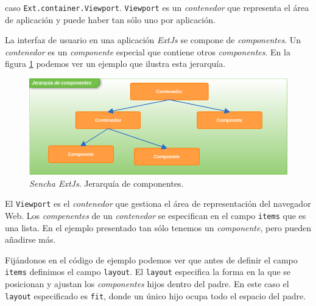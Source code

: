 	caso \texttt{Ext.container.Viewport}. \texttt{Viewport} es un \emph{contenedor} que representa el área de aplicación y puede haber tan sólo
	uno por aplicación. 
 	\par
	La interfaz de usuario en una aplicación \emph{ExtJs} se compone de \emph{componentes}. Un \emph{contenedor} es un \emph{componente} especial que
	contiene otros \emph{componentes}. En la figura \ref{fig:comps} podemos ver un ejemplo que ilustra esta jerarquía.
	\begin{figure}[h]
		\centering
		\includegraphics[keepaspectratio, width=1\textwidth]{./img/comps.png}
		\caption{\emph{Sencha ExtJs}. Jerarquía de componentes.}   
		\label{fig:comps}
	\end{figure}
 	\par
	El \texttt{Viewport} es el \emph{contenedor} que gestiona el área de representación del navegador Web. Los \emph{compenentes} de un
	\emph{contenedor} se especifican en el campo \texttt{items} que es una lista. En el ejemplo presentado tan sólo tenemos un \emph{componente},
	pero pueden añadirse más.
 	\par
	Fijándonos en el código de ejemplo podemos ver que antes de definir el campo \texttt{items} definimos el campo \texttt{layout}. El
	\texttt{layout} especifica la forma en la que se posicionan y ajustan los \emph{componentes} hijos dentro del padre. En este caso el
	\texttt{layout} especificado es \texttt{\cc fit\cc}, donde un único hijo ocupa todo el espacio del padre.

